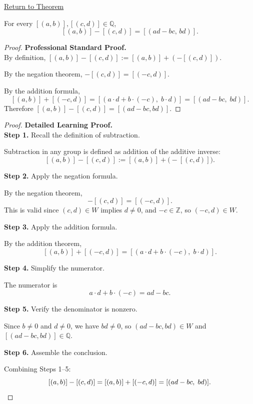 \newpage
{}
\label{prf:ec-subtraction}

\begin{remark*}[Return]
\hyperref[thm:ec-subtraction]{Return to Theorem}
\end{remark*}

\begin{theorem*}
For every $[(a,b)],[(c,d)]\in\mathbb{Q}$,
\[
[(a,b)] - [(c,d)] = [(ad-bc,\,bd)].
\]
\end{theorem*}

\begin{proof}
\textbf{Professional Standard Proof.}~\\
By definition, $[(a,b)] - [(c,d)] := [(a,b)] + (-[(c,d)])$.

By the negation theorem, $-[(c,d)] = [(-c,d)]$.

By the addition formula,
\[
[(a,b)] + [(-c,d)]
= [(a\cdot d + b\cdot(-c),\; b\cdot d)]
= [(ad - bc,\; bd)].
\]
Therefore $[(a,b)] - [(c,d)] = [(ad-bc,bd)]$.
\end{proof}

\begin{proof}
\textbf{Detailed Learning Proof.}~\\

\textbf{Step 1.} Recall the definition of subtraction.

Subtraction in any group is defined as addition of the additive inverse:
\[
[(a,b)] - [(c,d)] := [(a,b)] + \bigl(-[(c,d)]\bigr).
\]

\textbf{Step 2.} Apply the negation formula.

By the negation theorem,
\[
-[(c,d)] = [(-c,d)].
\]
This is valid since $(c,d)\in W$ implies $d\neq 0$, and $-c\in\mathbb{Z}$,
so $(-c,d)\in W$.

\textbf{Step 3.} Apply the addition formula.

By the addition theorem,
\[
[(a,b)] + [(-c,d)]
= [(a\cdot d + b\cdot(-c),\; b\cdot d)].
\]

\textbf{Step 4.} Simplify the numerator.

The numerator is
\[
a\cdot d + b\cdot(-c) = ad - bc.
\]

\textbf{Step 5.} Verify the denominator is nonzero.

Since $b\neq 0$ and $d\neq 0$, we have $bd\neq 0$, so $(ad-bc,bd)\in W$
and $[(ad-bc,bd)]\in\mathbb{Q}$.

\textbf{Step 6.} Assemble the conclusion.

Combining Steps 1--5:
\[
[(a,b)] - [(c,d)]
= [(a,b)] + [(-c,d)]
= [(ad-bc,\; bd)]. \qedhere
\]
\end{proof}

